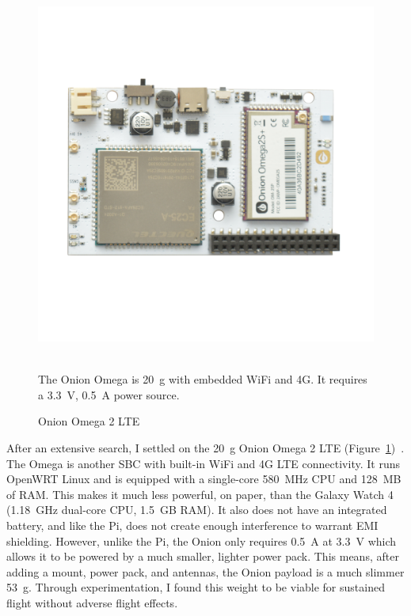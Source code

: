 \begin{figure}
    \centering
    \vspace{-0.5in}
    \includegraphics[width=0.4\linewidth]{chapter5/FIGS/onion.png}
    \vspace{-0.5in}
    \begin{captext}
    \small \\[0.1cm] The Onion Omega is 20~g with embedded WiFi and 4G. It requires a 3.3~V, 0.5~A power source. 
    \end{captext}
    \caption{Onion Omega 2 LTE~\cite{Onion}}
    \label{fig:onion}
\end{figure}

After an extensive search, I settled on the 20~g Onion Omega 2 LTE (Figure~\ref{fig:onion})~\cite{Onion}. The Omega is another SBC with built-in WiFi and 4G LTE connectivity. It runs OpenWRT Linux and is equipped with a single-core 580~MHz CPU and 128~MB of RAM. This makes it much less powerful, on paper, than the Galaxy Watch 4 (1.18~GHz dual-core CPU, 1.5~GB RAM). It also does not have an integrated battery, and like the Pi, does not create enough interference to warrant EMI shielding. However, unlike the Pi, the Onion only requires 0.5~A at 3.3~V which allows it to be powered by a much smaller, lighter power pack. This means, after adding a mount, power pack, and antennas, the Onion payload is a much slimmer 53~g. Through experimentation, I found this weight to be viable for sustained flight without adverse flight effects.


